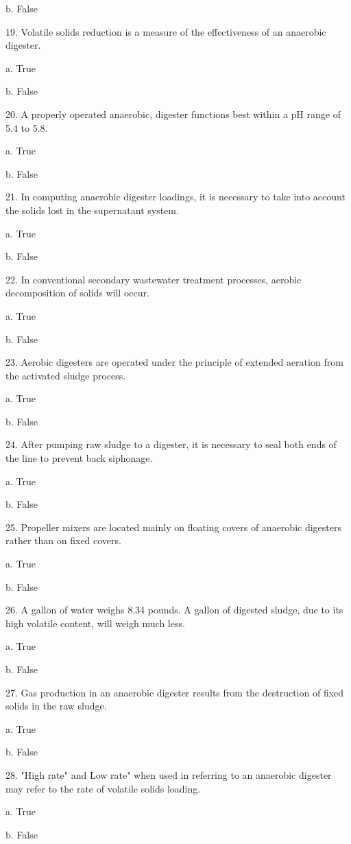 \documentclass{article}
\begin{document}
b. False 


19. Volatile solids reduction is a measure of the effectiveness of an anaerobic digester. 

a. True 

b. False 


20. A properly operated anaerobic, digester functions best within a pH range of 5.4 to 5.8. 

a. True 

b. False 


21. In computing anaerobic digester loadings, it is necessary to take into account the solids lost in the supernatant system. 

a. True 

b. False 


22. In conventional secondary wastewater treatment processes, aerobic decomposition of solids will occur. 

a. True 

b. False 


23. Aerobic digesters are operated under the principle of extended aeration from the activated sludge process. 

a. True 

b. False 


24. After pumping raw sludge to a digester, it is necessary to seal both ends of the line to prevent back siphonage. 

a. True 

b. False 


25. Propeller mixers are located mainly on floating covers of anaerobic digesters rather than on fixed covers. 

a. True 

b. False 


26. A gallon of water weighs 8.34 pounds. A gallon of digested sludge, due to its high volatile content, will weigh much less. 

a. True 

b. False 


27. Gas production in an anaerobic digester results from the destruction of fixed solids in the raw sludge. 

a. True 

b. False 


28. "High rate" and Low rate" when used in referring to an anaerobic digester may refer to the rate of volatile solids loading. 

a. True 

b. False 
\end{document}
